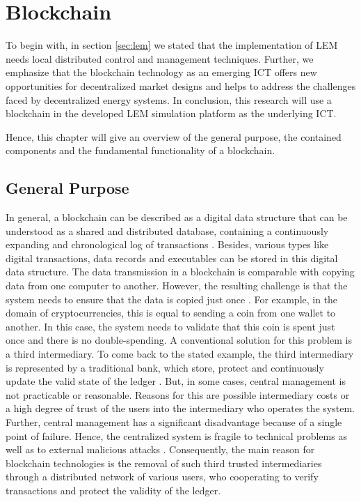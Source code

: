 \section{Blockchain}
\label{sec:about_blockchain}

To begin with, in section \ref{sec:lem} we stated that the implementation of LEM
needs local distributed control and management techniques. Further, we emphasize
that the blockchain technology as an emerging ICT offers new opportunities for decentralized
market designs and helps to address the challenges faced by decentralized energy systems. 
In conclusion, this research will use a blockchain in the developed LEM simulation platform 
as the underlying ICT. 

Hence, this chapter will give an overview of the general purpose, 
the contained components and the fundamental functionality of a blockchain. 

\subsection{General Purpose}
In general, a blockchain can be described as a digital data structure that can be understood as a shared and 
distributed database, containing a continuously expanding and chronological log of transactions . 
Besides, various types like digital transactions, data records and executables can be stored in this digital data structure. 
The data transmission in a blockchain is comparable with copying data from one computer to another. However, the resulting challenge 
is that the system needs to ensure that the data is copied just once . 
For example, in the domain of cryptocurrencies, this is equal to sending a coin from one wallet to another. 
In this case, the system needs to validate that this coin is spent just once and there is no double-spending. 
A conventional solution for this problem is a third intermediary. To come back to the stated example, the third 
intermediary is represented by a traditional bank, which store, protect and continuously update the valid state of 
the ledger . But, in some cases, central management is not practicable or reasonable. 
Reasons for this are possible intermediary costs or a high degree of trust of the users into the intermediary who operates 
the system. Further, central management has a significant disadvantage because of a single point of failure. 
Hence, the centralized system is fragile to technical problems as well as to external malicious attacks .
Consequently, the main reason for blockchain technologies is the removal of such third 
trusted intermediaries through a distributed network of various users, who cooperating 
to verify transactions and protect the validity of the ledger.


